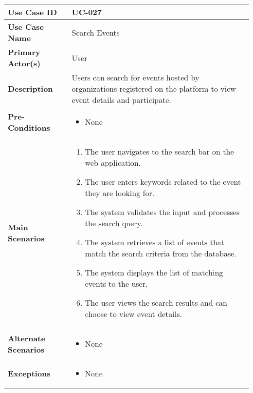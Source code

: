 \begin{table}[!ht]
    \centering
    \renewcommand{\arraystretch}{1.3} %
    \begin{tabularx}{\textwidth}{|l|X|}
        \hline
        \textbf{Use Case ID} & UC-027 \\
        \hline
        \textbf{Use Case Name} & Search Events \\
        \hline
        \textbf{Primary Actor(s)} & User \\
        \hline
        \textbf{Description} & Users can search for events hosted by organizations registered on the platform to view event details and participate. \\
        \hline
        \textbf{Pre-Conditions} & 
        \begin{itemize}[label=--,itemsep=0pt]
            \item None
        \end{itemize} \\
        \hline
        \textbf{Main Scenarios} & 
        \begin{enumerate}[label=\arabic*.,itemsep=0pt]
            \item The user navigates to the search bar on the web application.
            \item The user enters keywords related to the event they are looking for.
            \item The system validates the input and processes the search query.
            \item The system retrieves a list of events that match the search criteria from the database.
            \item The system displays the list of matching events to the user.
            \item The user views the search results and can choose to view event details.
        \end{enumerate} \\
        \hline
        \textbf{Alternate Scenarios} & 
        \begin{itemize}[label=--,itemsep=0pt]
            \item None
        \end{itemize} \\
        \hline
        \textbf{Exceptions} & 
        \begin{itemize}[label=--,itemsep=0pt]
            \item None
        \end{itemize} \\

\end{tabularx}
\end{table}
